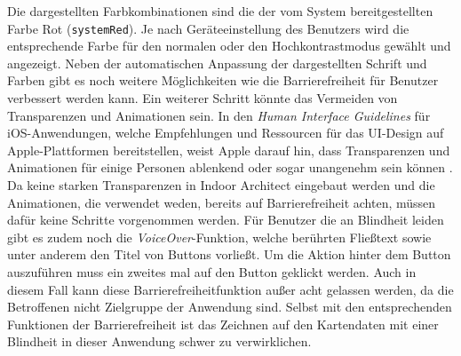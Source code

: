 Die dargestellten Farbkombinationen sind die der vom System bereitgestellten Farbe Rot (\texttt{systemRed}).
Je nach Geräteeinstellung des Benutzers wird die entsprechende Farbe für den normalen oder den Hochkontrastmodus gewählt und angezeigt.\pbreak%
%
Neben der automatischen Anpassung der dargestellten Schrift und Farben gibt es noch weitere Möglichkeiten wie die Barrierefreiheit für Benutzer verbessert werden kann.
Ein weiterer Schritt könnte das Vermeiden von Transparenzen und Animationen sein.
In den \emph{Human Interface Guidelines} für iOS-Anwendungen, welche Empfehlungen und Ressourcen für das UI-Design auf Apple-Plattformen bereitstellen, weist Apple darauf hin, dass Transparenzen und Animationen für einige Personen ablenkend oder sogar unangenehm sein können \parencite{APP2020a}.
Da keine starken Transparenzen in Indoor Architect eingebaut werden und die Animationen, die verwendet weden, bereits auf Barrierefreiheit achten, müssen dafür keine Schritte vorgenommen werden.
Für Benutzer die an Blindheit leiden gibt es zudem noch die \emph{VoiceOver}-Funktion, welche berührten Fließtext sowie unter anderem den Titel von Buttons vorließt.
Um die Aktion hinter dem Button auszuführen muss ein zweites mal auf den Button geklickt werden.
Auch in diesem Fall kann diese Barrierefreiheitfunktion außer acht gelassen werden, da die Betroffenen nicht Zielgruppe der Anwendung sind.
Selbst mit den entsprechenden Funktionen der Barrierefreiheit ist das Zeichnen auf den Kartendaten mit einer Blindheit in dieser Anwendung schwer zu verwirklichen.

